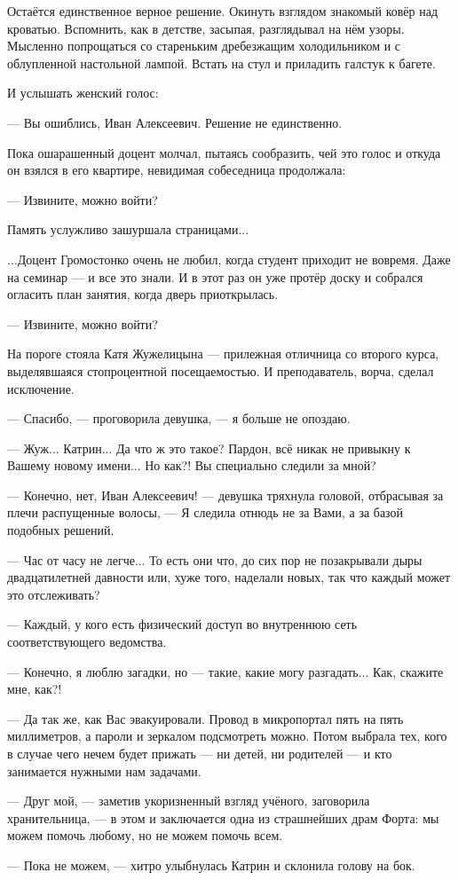 Остаётся единственное верное решение. Окинуть взглядом знакомый ковёр над кроватью.
Вспомнить, как в детстве, засыпая, разглядывал на нём узоры.
Мысленно попрощаться со стареньким дребезжащим холодильником и с облупленной настольной лампой.
Встать на стул и приладить галстук к багете.

И услышать женский голос:

--- Вы ошиблись, Иван Алексеевич. Решение не единственно.

\emptypar

Пока ошарашенный доцент молчал, пытаясь сообразить, чей это голос и откуда он взялся в его квартире,
невидимая собеседница продолжала:

--- Извините, можно войти?

Память услужливо зашуршала страницами...

\begin{achronic}

...Доцент Громостонко очень не любил, когда студент приходит не вовремя. Даже на семинар --- и все это знали.
И в этот раз он уже протёр доску и собрался огласить план занятия, когда дверь приоткрылась.

--- Извините, можно войти?

На пороге стояла Катя Жужелицына --- прилежная отличница со второго курса, выделявшаяся стопроцентной посещаемостью.
И преподаватель, ворча, сделал исключение.

--- Спасибо, --- проговорила девушка, --- я больше не опоздаю.

\end{achronic}

--- Жуж... Катрин... Да что ж это такое? Пардон, всё никак не привыкну к Вашему новому имени... Но как?!
Вы специально следили за мной?

--- Конечно, нет, Иван Алексеевич! --- девушка тряхнула головой, отбрасывая за плечи распущенные волосы,
--- Я следила отнюдь не за Вами, а за базой подобных решений.

--- Час от часу не легче... То есть они что, до сих пор не позакрывали дыры двадцатилетней давности или,
хуже того, наделали новых, так что каждый может это отслеживать?

--- Каждый, у кого есть физический доступ во внутреннюю сеть соответствующего ведомства.

--- Конечно, я люблю загадки, но --- такие, какие могу разгадать... Как, скажите мне, как?!

--- Да так же, как Вас эвакуировали. Провод в микропортал пять на пять миллиметров, а пароли и зеркалом подсмотреть можно.
Потом выбрала тех, кого в случае чего нечем будет прижать --- ни детей, ни родителей --- и кто занимается нужными нам задачами.

--- Друг мой, --- заметив укоризненный взгляд учёного, заговорила хранительница, ---
в этом и заключается одна из страшнейших драм Форта: мы можем помочь любому, но не можем помочь всем.

--- Пока не можем, --- хитро улыбнулась Катрин и склонила голову на бок.

\emptypar


\emptypar

